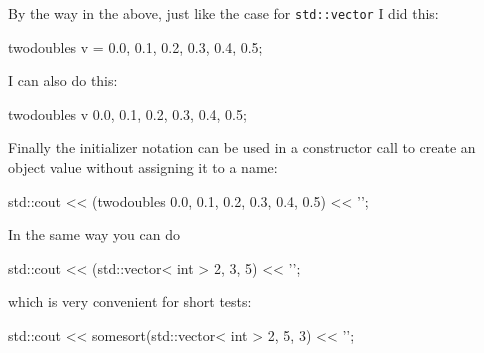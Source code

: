 By the way in the above, just like the case for \verb!std::vector!
I did this:
\begin{console}[frame=single, fontsize=\footnotesize]
twodoubles v = {{0.0, 0.1}, {0.2, 0.3}, {0.4, 0.5}};
\end{console}
I can also do this:
\begin{console}[frame=single, fontsize=\footnotesize]
twodoubles v {{0.0, 0.1}, {0.2, 0.3}, {0.4, 0.5}};
\end{console}

Finally the initializer notation can be used in a constructor call
to create an object value without assigning it to a name:
\begin{console}[frame=single, fontsize=\footnotesize]
std::cout << (twodoubles {{0.0, 0.1}, {0.2, 0.3}, {0.4, 0.5}}) << '\n';
\end{console}
In the same way you can do
\begin{console}[frame=single, fontsize=\footnotesize]
std::cout << (std::vector< int > {2, 3, 5}) << '\n';
\end{console}
which is very convenient for short tests:
\begin{console}[frame=single, fontsize=\footnotesize]
std::cout << somesort(std::vector< int > {2, 5, 3}) << '\n';
\end{console}
